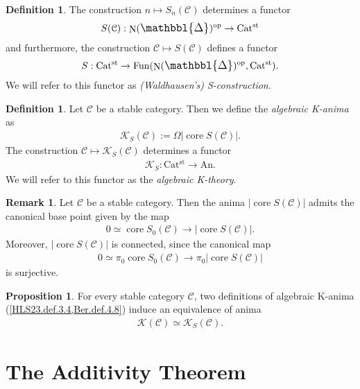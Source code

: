 \documentclass[a4paper,dvipdfmx,11pt,reqno]{amsart}
\DeclareMathOperator{\myop}{op}
\DeclareMathOperator{\N}{N}
\DeclareMathOperator{\Fun}{Fun}
\newcommand{\C}{\mathcal{C}}
\newcommand{\K}{\mathcal{K}}
\DeclareMathOperator{\core}{core}
\newcommand{\An}{\mathrm{An}}
\newcommand{\Catst}{\mathrm{Cat^{st}}}
\newcommand{\prism}{{\mathlarger{\mathbbl{\Delta}}}}
\theoremstyle{definition}
\newtheorem{definition}[theorem]{Definition}
\newtheorem{proposition}[theorem]{Proposition}
\newtheorem{remark}[theorem]{Remark}
\begin{document}
\begin{definition} \label{Ber.rem.4.5}
  The construction $n \mapsto S_n(\C)$ determines a functor 
  \begin{align*}
    S(\C) : \N(\prism)^{\myop} \to \Catst
  \end{align*}
  and furthermore, the construction $\C \mapsto S(\C)$ defines a functor 
  \begin{align*}
    S : \Catst \to \Fun(\N(\prism)^{\myop},\Catst).
  \end{align*}
  We will refer to this functor as \textit{(Waldhausen's) S-construction}.
\end{definition}

\begin{definition} \label{Ber.def.4.8}
  Let $\C$ be a stable category.
  Then we define the \textit{algebraic K-anima} as 
  \begin{align*}
    \K_S(\C) := \Omega|\core S(\C)|.
  \end{align*}
  The construction $\C \mapsto \K_S(\C)$ determines a functor 
  \begin{align*}
    \K_S : \Catst \to \An.
  \end{align*}
  We will refer to this functor as the \textit{algebraic K-theory}.
\end{definition}
 
\begin{remark} %
  Let $\C$ be a stable category.
  Then the anima $|\core S(\C)|$ admits the canonical base point given by the map 
  \begin{align*}
    0 \simeq \core S_0(\C) \to |\core S(\C)|.
  \end{align*}
  Moreover, $|\core S(\C)|$ is connected, since the canonical map 
  \begin{align*}
    0 \simeq \pi_0 \core S_0(\C) \to \pi_0 |\core S(\C)|
  \end{align*}
  is surjective.
\end{remark}

\begin{proposition} \label{Ber.prop.4.37}
  For every stable category $\C$, two definitions of algebraic K-anima (\cref{HLS23.def.3.4,Ber.def.4.8}) induce an equivalence of anima
  \begin{align*}
    \K(\C) \simeq \K_S(\C).
  \end{align*}
\end{proposition}


\section{The Additivity Theorem}
\end{document}
